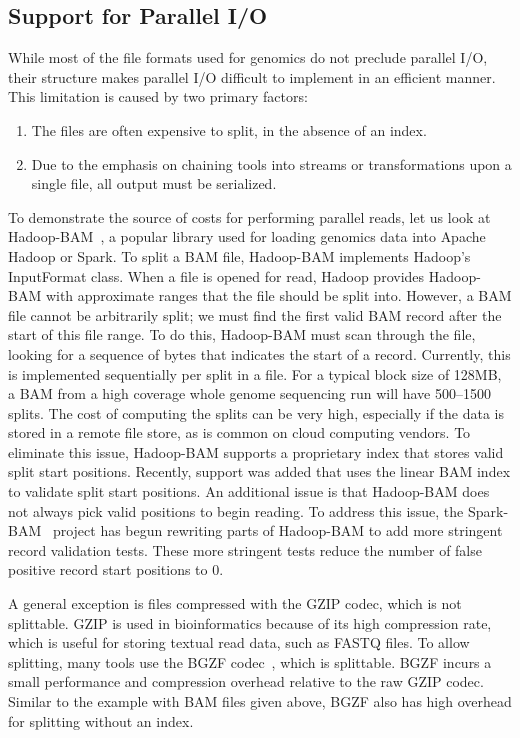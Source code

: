 \documentclass[phd]{ucbthesis}
\begin{document}
\subsection{Support for Parallel I/O}
\label{sec:parallel-io}

While most of the file formats used for genomics do not preclude parallel I/O,
their structure makes parallel I/O difficult to implement in an efficient
manner. This limitation is caused by two primary factors:

\begin{enumerate}
\item The files are often expensive to split, in the absence of an index.
\item Due to the emphasis on chaining tools into streams or transformations upon
  a single file, all output must be serialized.
\end{enumerate}

To demonstrate the source of costs for performing parallel reads, let us look at
{Hadoop-BAM}~\cite{niemenmaa12}, a popular library used for loading
genomics data into {Apache Hadoop} or {Spark}. To split a BAM file,
{Hadoop-BAM} implements {Hadoop}'s InputFormat class. When a file
is opened for read, {Hadoop} provides {Hadoop-BAM} with approximate
ranges that the file should be split into. However, a BAM file cannot be
arbitrarily split; we must find the first valid BAM record after the start of
this file range. To do this, {Hadoop-BAM} must scan through the file,
looking for a sequence of bytes that indicates the start of a record. Currently,
this is implemented sequentially per split in a file. For a typical block size
of 128MB, a BAM from a high coverage whole genome sequencing run will have
500--1500 splits. The cost of computing the splits can be very high, especially
if the data is stored in a remote file store, as is common on cloud computing
vendors. To eliminate this issue, {Hadoop-BAM} supports a proprietary
index that stores valid split start positions. Recently, support was added that
uses the linear BAM index to validate split start positions. An additional issue
is that {Hadoop-BAM} does not always pick valid positions to begin
reading. To address this issue, the {Spark-BAM}~\cite{sparkbam} project
has begun rewriting parts of {Hadoop-BAM} to add more stringent record
validation tests. These more stringent tests reduce the number of false positive
record start positions to 0.

A general exception is files compressed with the GZIP codec, which is not
splittable. GZIP is used in bioinformatics because of its high compression rate,
which is useful for storing textual read data, such as FASTQ files. To allow
splitting, many tools use the BGZF codec~\cite{li11tabix}, which is splittable.
BGZF incurs a small performance and compression overhead relative to the raw
GZIP codec. Similar to the example with BAM files given above, BGZF also has
high overhead for splitting without an index.
\end{document}
